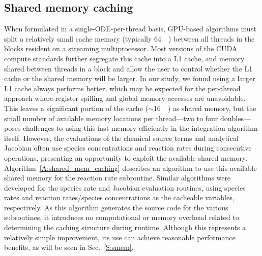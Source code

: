 \documentclass[preprint]{elsarticle}
\begin{document}
\subsection{Shared memory caching}

When formulated in a single-ODE-per-thread basis, GPU-based algorithms must split a relatively small cache memory (typically \SI{64}{\kilo\byte}) between all threads in the blocks resident on a streaming multiprocessor.
Most versions of the CUDA compute standards further segregate this cache into a L1 cache, and memory shared between threads in a block and allow the user to control whether the L1 cache or the shared memory will be larger.
In our study, we found using a larger L1 cache always performs better, which may be expected for the per-thread approach where register spilling and global memory accesses are unavoidable.
This leaves a significant portion of the cache ($\sim$\SI{16}{\kilo\byte}) as shared memory, but the small number of available memory locations per thread---two to four doubles---poses challenges to using this fast memory efficiently in the integration algorithm itself.
However, the evaluations of the chemical source terms and analytical Jacobian often use species concentrations and reaction rates during consecutive operations, presenting an opportunity to exploit the available shared memory.
Algorithm~\ref{A:shared_mem_caching} describes an algorithm to use this available shared memory for the reaction rate subroutine. 
Similar algorithms were developed for the species rate and Jacobian evaluation routines, using species rates and reaction rates\slash species concentrations as the cacheable variables, respectively.
As this algorithm generates the source code for the various subroutines, it introduces no computational or memory overhead related to determining the caching structure during runtime.
Although this represents a relatively simple improvement, its use can achieve reasonable performance benefits, as will be seen in Sec.~\ref{S:smem}.
\end{document}
